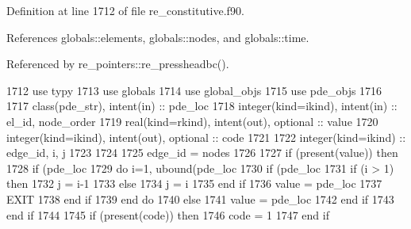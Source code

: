 Definition at line 1712 of file re\+\_\+constitutive.\+f90.



References globals\+::elements, globals\+::nodes, and globals\+::time.



Referenced by re\+\_\+pointers\+::re\+\_\+pressheadbc().


\begin{DoxyCode}
1712         \textcolor{keywordtype}{use }typy
1713         \textcolor{keywordtype}{use }globals
1714         \textcolor{keywordtype}{use }global_objs
1715         \textcolor{keywordtype}{use }pde_objs
1716 
1717         \textcolor{keywordtype}{class}(pde_str), \textcolor{keywordtype}{intent(in)} :: pde\_loc
1718         \textcolor{keywordtype}{integer(kind=ikind)}, \textcolor{keywordtype}{intent(in)}  :: el\_id, node\_order
1719         \textcolor{keywordtype}{real(kind=rkind)}, \textcolor{keywordtype}{intent(out)}, \textcolor{keywordtype}{optional}    :: value
1720         \textcolor{keywordtype}{integer(kind=ikind)}, \textcolor{keywordtype}{intent(out)}, \textcolor{keywordtype}{optional} :: code
1721 
1722         \textcolor{keywordtype}{integer(kind=ikind)} :: edge\_id, i, j
1723 
1724         
1725         edge\_id = nodes%
1726 
1727         \textcolor{keywordflow}{if} (\textcolor{keyword}{present}(\textcolor{keywordtype}{value})) \textcolor{keywordflow}{then}
1728           \textcolor{keywordflow}{if} (pde\_loc%
1729             \textcolor{keywordflow}{do} i=1, ubound(pde\_loc%
1730               \textcolor{keywordflow}{if} (pde\_loc%
1731                 \textcolor{keywordflow}{if} (i > 1) \textcolor{keywordflow}{then}
1732                   j = i-1
1733                 \textcolor{keywordflow}{else}
1734                   j = i
1735 \textcolor{keywordflow}{                end if}
1736                 \textcolor{keywordtype}{value} = pde\_loc%
1737                 \textcolor{keywordflow}{EXIT}
1738 \textcolor{keywordflow}{              end if}
1739 \textcolor{keywordflow}{            end do}
1740           \textcolor{keywordflow}{else}
1741             \textcolor{keywordtype}{value} = pde\_loc%
1742 \textcolor{keywordflow}{          end if}
1743 \textcolor{keywordflow}{        end if}
1744 
1745         \textcolor{keywordflow}{if} (\textcolor{keyword}{present}(code)) \textcolor{keywordflow}{then}
1746           code = 1
1747 \textcolor{keywordflow}{        end if}
\end{DoxyCode}


